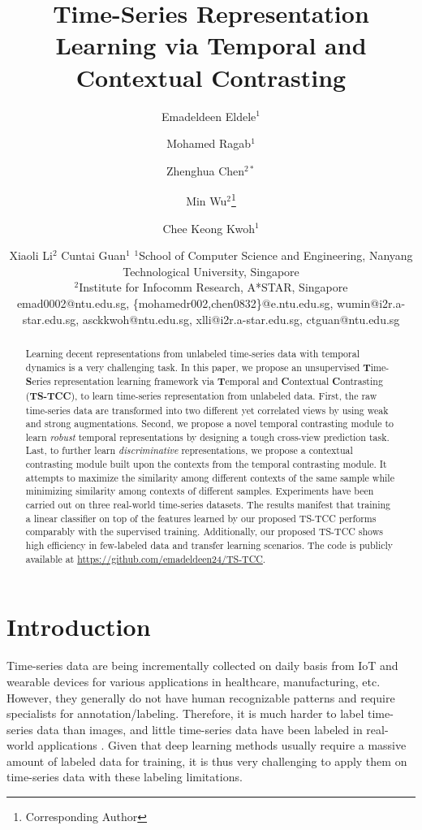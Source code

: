 \documentclass{article}
\title{Time-Series Representation Learning via Temporal and Contextual Contrasting}
\author{
Emadeldeen Eldele$^1$ \and
Mohamed Ragab$^1$\and
Zhenghua Chen$^{2*}$\and
Min Wu$^{2}$\footnote{Corresponding Author}\and
Chee Keong Kwoh$^1$\and
Xiaoli Li$^2$\And
Cuntai Guan$^1$
\affiliations
$^1$School of Computer Science and Engineering, Nanyang Technological University, Singapore\\
$^2$Institute for Infocomm Research, A*STAR, Singapore\\
\emails
emad0002@ntu.edu.sg, \{mohamedr002,chen0832\}@e.ntu.edu.sg, wumin@i2r.a-star.edu.sg, asckkwoh@ntu.edu.sg, xlli@i2r.a-star.edu.sg, ctguan@ntu.edu.sg
}
\begin{document}
\thispagestyle{myheadings}



\maketitle
\begin{abstract}
Learning decent representations from unlabeled time-series data with temporal dynamics is a very challenging task. In this paper, we propose an unsupervised \textbf{T}ime-\textbf{S}eries representation learning framework via \textbf{T}emporal and \textbf{C}ontextual \textbf{C}ontrasting (\textbf{TS-TCC}), to learn time-series representation from unlabeled data. First, the raw time-series data are transformed into two different yet correlated views by using weak and strong augmentations. Second, we propose a novel temporal contrasting module to learn \textit{robust} temporal representations by designing a tough cross-view prediction task. Last, to further learn \textit{discriminative} representations, we propose a contextual contrasting module built upon the contexts from the temporal contrasting module. It attempts to maximize the similarity among different contexts of the same sample while minimizing similarity among contexts of different samples. Experiments have been carried out on three real-world time-series datasets. The results manifest that training a linear classifier on top of the features learned by our proposed TS-TCC performs comparably with the supervised training. Additionally, our proposed TS-TCC shows high efficiency in few-labeled data and transfer learning scenarios. The code is publicly available at \url{https://github.com/emadeldeen24/TS-TCC}. 
\end{abstract}

\section{Introduction}
Time-series data are being incrementally collected on daily basis from IoT and wearable devices for various applications in healthcare, manufacturing, etc. However, they generally do not have human recognizable patterns and require specialists for annotation/labeling. Therefore, it is much harder to label time-series data than images, and little time-series data have been labeled in real-world applications \cite{ching2018opportunities}. Given that deep learning methods usually require a massive amount of labeled data for training, it is thus very challenging to apply them on time-series data with these labeling limitations. 
\end{document}
